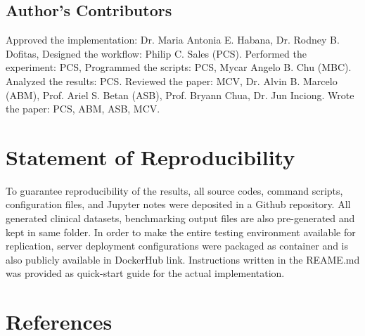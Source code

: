 \documentclass[5p]{elsarticle}
\begin{document}
\subsection*{Author's Contributors} 
Approved the implementation: Dr. Maria Antonia E. Habana, Dr. Rodney B. Dofitas, 
Designed the workflow: Philip C. Sales (PCS). Performed the experiment: PCS, 
Programmed the scripts: PCS, Mycar Angelo B. Chu (MBC). Analyzed the results: PCS. 
Reviewed the paper: MCV, Dr. Alvin B. Marcelo (ABM), Prof. Ariel S. Betan (ASB), Prof. Bryann Chua, Dr. Jun Inciong. 
Wrote the paper: PCS, ABM, ASB, MCV.

\section*{Statement of Reproducibility}
To guarantee reproducibility of the results, all source codes, command scripts, configuration files, and Jupyter notes were deposited in a Github repository. 
All generated clinical datasets, benchmarking output files are also pre-generated and kept in same folder. 
In order to make the entire testing environment available for replication, server deployment configurations were packaged as container and is also publicly available in DockerHub link. 
Instructions written in the REAME.md was provided as quick-start guide for the actual implementation.

\section*{References}


\end{document}
